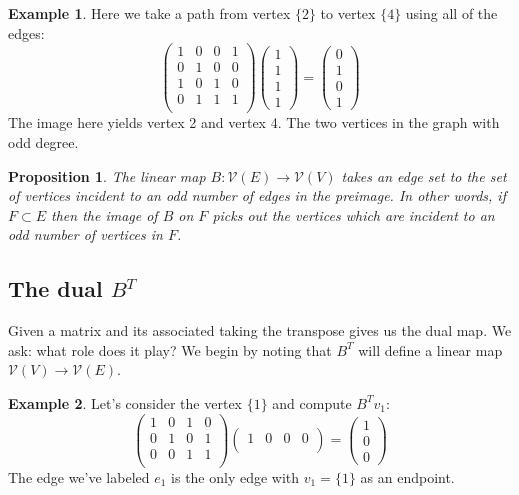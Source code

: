 \documentclass[10pt, letterpaper]{article}
\newtheorem{prop}{Proposition}
\theoremstyle{remark}
\theoremstyle{definition}
\newtheorem{ex}{Example}
\begin{document}
\begin{ex}
 Here we take a path from vertex $\{2\}$ to vertex $\{4\}$ using all of the edges:
 \[
 	\begin{pmatrix}
		1 & 0 & 0 & 1 \\
		0 & 1 & 0 & 0 \\
		1 & 0 & 1 & 0 \\
		0 & 1 & 1 & 1 \\
	\end{pmatrix}
	\begin{pmatrix}
		1 \\ 1 \\ 1 \\ 1
	\end{pmatrix} = 
	\begin{pmatrix}
		0 \\ 1 \\ 0 \\ 1
	\end{pmatrix}
 \]
 The image here yields vertex 2 and vertex 4. The two vertices in the graph with odd degree.
\end{ex}

\begin{prop}
	The linear map $B: \mathcal{V}(E) \rightarrow \mathcal{V}(V)$ takes an edge set to the set of vertices incident to an odd number of edges in the preimage. In other words, if $F \subset E$ then the image of $B$ on $F$ picks out the vertices which are incident to an odd number of vertices in $F$.
\end{prop}

\subsection{The dual $B^T$}
Given a matrix and its associated taking the transpose gives us the dual map. We ask: what role does it play? We begin by noting that $B^T$ will define a linear map $\mathcal{V}(V) \rightarrow \mathcal{V}(E)$.

\begin{ex}
	Let's consider the vertex $\{1\}$ and compute $B^Tv_1$:
	\[
		\begin{pmatrix}
			1 & 0 & 1 & 0 \\
			0 & 1 & 0 & 1 \\
			0 & 0 & 1 & 1 \\
		\end{pmatrix}
		\begin{pmatrix}
			1 & 0 & 0 & 0 \\
		\end{pmatrix} = 
		\begin{pmatrix}
			1 \\ 0 \\ 0 
		\end{pmatrix}
	\]
	The edge we've labeled $e_1$ is the only edge with $v_1=\{1\}$ as an endpoint.
\end{ex}
\end{document}

